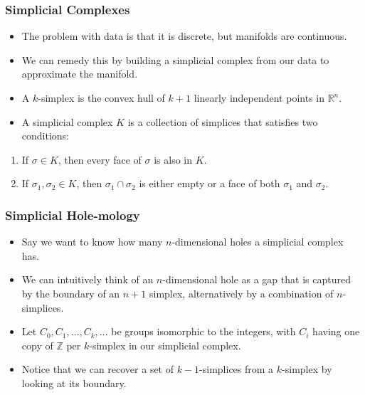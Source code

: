 \documentclass{beamer}
\begin{document}
\begin{frame}%

\frametitle{Simplicial Complexes}

\begin{itemize}

\item The problem with data is that it is discrete, but manifolds are continuous.

\pause

\item We can remedy this by building a simplicial complex from our data to approximate the manifold.

\pause

\item A $k$-simplex is the convex hull of $k+1$ linearly independent points in $\mathbb{R}^n$.
\pause

\item A simplicial complex $K$ is a collection of simplices that satisfies two conditions:
\end{itemize}

\begin{enumerate}

\item If $\sigma \in K$, then every face of $\sigma$ is also in $K$.

\item If $\sigma_1, \sigma_2 \in K$, then $\sigma_1 \cap \sigma_2$ is either empty or a face of both
  $\sigma_1$ and $\sigma_2$.
\end{enumerate}


\end{frame}




\begin{frame}%
  \frametitle{Simplicial Hole-mology}

  \begin{itemize}
    \item Say we want to know how many $n$-dimensional holes a simplicial complex has.
      \pause
    \item We can intuitively think of an $n$-dimensional hole as a gap that is captured by the
      boundary of an $n+1$ simplex, alternatively by a combination of $n$-simplices. 
     \pause
   \item Let $C_0, C_1, \ldots, C_k, \ldots$ be groups isomorphic to the integers, with $C_i$ having
     one copy of $\mathbb{Z}$ per $k$-simplex in our simplicial complex. 
     \pause
   \item Notice that we can recover a set of $k-1$-simplices from a $k$-simplex by looking at its
     boundary.

 \end{itemize}

\end{frame}%
\end{document}
